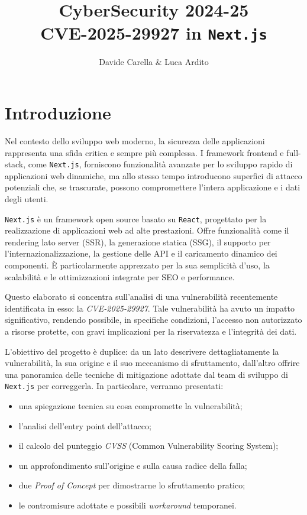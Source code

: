 \documentclass[a4paper,oneside,12pt]{report}
\title{\textbf{CyberSecurity 2024-25} \\ CVE-2025-29927 in \texttt{Next.js}}
\author{Davide Carella \& Luca Ardito}
\date{}
\begin{document}
\maketitle
\tableofcontents
\newpage

\chapter*{Introduzione}
\label{chap:introduzione}
\justifying

Nel contesto dello sviluppo web moderno, la sicurezza delle applicazioni rappresenta una sfida critica e sempre più complessa. I framework frontend e full-stack, come \texttt{Next.js}, forniscono funzionalità avanzate per lo sviluppo rapido di applicazioni web dinamiche, ma allo stesso tempo introducono superfici di attacco potenziali che, se trascurate, possono compromettere l'intera applicazione e i dati degli utenti.

\texttt{Next.js} è un framework open source basato su \texttt{React}, progettato per la realizzazione di applicazioni web ad alte prestazioni. Offre funzionalità come il rendering lato server (SSR), la generazione statica (SSG), il supporto per l'internazionalizzazione, la gestione delle API e il caricamento dinamico dei componenti. È particolarmente apprezzato per la sua semplicità d’uso, la scalabilità e le ottimizzazioni integrate per SEO e performance.

Questo elaborato si concentra sull’analisi di una vulnerabilità recentemente identificata in esso: la \emph{CVE-2025-29927}. Tale vulnerabilità ha avuto un impatto significativo, rendendo possibile, in specifiche condizioni, l’accesso non autorizzato a risorse protette, con gravi implicazioni per la riservatezza e l'integrità dei dati.

L’obiettivo del progetto è duplice: da un lato descrivere dettagliatamente la vulnerabilità, la sua origine e il suo meccanismo di sfruttamento, dall’altro offrire una panoramica delle tecniche di mitigazione adottate dal team di sviluppo di \texttt{Next.js} per correggerla. In particolare, verranno presentati:
\begin{itemize}
  \item una spiegazione tecnica su cosa compromette la vulnerabilità;
  \item l’analisi dell’entry point dell’attacco;
  \item il calcolo del punteggio \emph{CVSS} (Common Vulnerability Scoring System);
  \item un approfondimento sull’origine e sulla causa radice della falla;
  \item due \textit{Proof of Concept} per dimostrarne lo sfruttamento pratico;
  \item le contromisure adottate e possibili \textit{workaround} temporanei.
\end{itemize}
\end{document}
